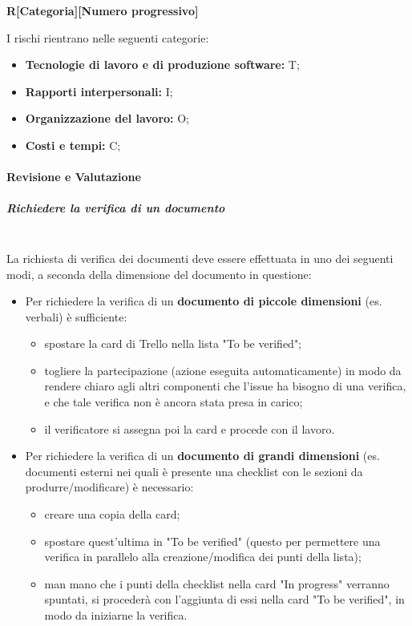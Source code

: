 \begin{center}
    \textbf{R[Categoria][Numero progressivo]}
\end{center}

I rischi rientrano nelle seguenti categorie:
\begin{itemize}
    \item \textbf{Tecnologie di lavoro e di produzione software:} T;
    \item \textbf{Rapporti interpersonali:} I;
    \item \textbf{Organizzazione del lavoro:} O;
    \item \textbf{Costi e tempi:} C;
\end{itemize}


\paragraph{Revisione e Valutazione}

\subparagraph{Richiedere la verifica di un documento}
\mbox{}\\
La richiesta di verifica dei documenti deve essere effettuata in uno dei seguenti modi, 
a seconda della dimensione del documento in questione:
\begin{itemize}
    \item Per richiedere la verifica di un \textbf{documento di piccole dimensioni} (es. verbali) è sufficiente:
    \begin{itemize}
        \item spostare la card di Trello nella lista "To be verified"; 
        \item togliere la partecipazione (azione eseguita automaticamente) in modo da rendere chiaro agli altri 
        componenti che l'issue ha bisogno di una verifica, e che tale verifica non è ancora stata presa in carico;
        \item il verificatore si assegna poi la card e procede con il lavoro.
    \end{itemize}
    \item Per richiedere la verifica di un \textbf{documento di grandi dimensioni} (es. documenti esterni nei quali è presente 
    una checklist con le sezioni da produrre/modificare) è necessario:
    \begin{itemize}
        \item creare una copia della card;
        \item spostare quest'ultima in "To be verified" (questo per permettere una verifica in parallelo alla 
        creazione/modifica dei punti della lista);
        \item man mano che i punti della checklist nella card "In progress" verranno spuntati, si procederà con 
        l'aggiunta di essi nella card "To be verified", in modo da iniziarne la verifica.
    \end{itemize}
\end{itemize}

